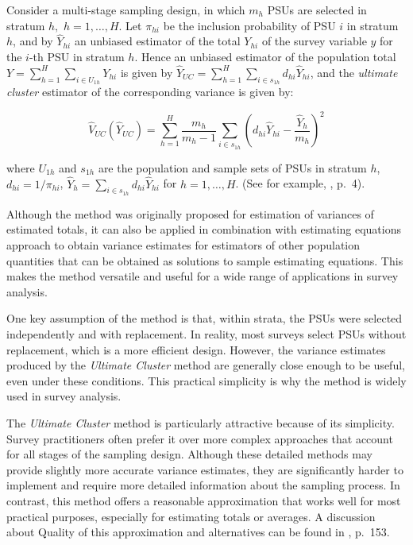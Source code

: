 \documentclass[
  12pt,
]{book}
\begin{document}
Consider a multi-stage sampling design, in which \(m_{h}\) PSUs are selected in stratum \(h,\) \(h=1,\ldots ,H\). Let \(\pi_{hi}\) be the inclusion probability of PSU \(i\) in stratum \(h\), and by \(\widehat{Y}_{hi}\) an unbiased estimator of the total \(Y_{hi}\) of the survey variable \(y\) for the \(i\)-th PSU in stratum \(h\). Hence an unbiased estimator of the population total \(Y = \sum_{h=1}^{H} \sum_{i \in U_{1h}} Y_{hi}\) is given by \(\widehat{Y}_{UC} = \sum_{h=1}^{H} \sum_{i \in s_{1h}} d_{hi} \widehat{Y}_{hi}\), and the \emph{ultimate cluster} estimator of the corresponding variance is given by:

\[
\widehat{V}_{UC} \left( \widehat{Y}_{UC}\right) = \sum_{h=1}^{H} \frac{m_{h}}
{m_{h}-1} \sum_{i \in s_{1h}} \left( d_{hi} \widehat{Y}_{hi} - \frac{\widehat{Y}_{h}}{m_{h}} \right) ^{2}
\]

where \(U_{1h}\) and \(s_{1h}\) are the population and sample sets of PSUs in stratum \(h\), \(d_{hi} = 1 / \pi_{hi}\), \(\widehat{Y}_{h} = \sum_{i \in s_{1h}} d_{hi} \widehat{Y}_{hi}\) for \(h=1,\ldots ,H\). (See for example, \citep{Shah1993}, p.~4).

Although the method was originally proposed for estimation of variances of estimated totals, it can also be applied in combination with estimating equations approach to obtain variance estimates for estimators of other population quantities that can be obtained as solutions to sample estimating equations. This makes the method versatile and useful for a wide range of applications in survey analysis.

One key assumption of the method is that, within strata, the PSUs were selected independently and with replacement. In reality, most surveys select PSUs without replacement, which is a more efficient design. However, the variance estimates produced by the \emph{Ultimate Cluster} method are generally close enough to be useful, even under these conditions. This practical simplicity is why the method is widely used in survey analysis.

The \emph{Ultimate Cluster} method is particularly attractive because of its simplicity. Survey practitioners often prefer it over more complex approaches that account for all stages of the sampling design. Although these detailed methods may provide slightly more accurate variance estimates, they are significantly harder to implement and require more detailed information about the sampling process. In contrast, this method offers a reasonable approximation that works well for most practical purposes, especially for estimating totals or averages. A discussion about Quality of this approximation and alternatives can be found in \citep{SSW92}, p.~153.
\end{document}
